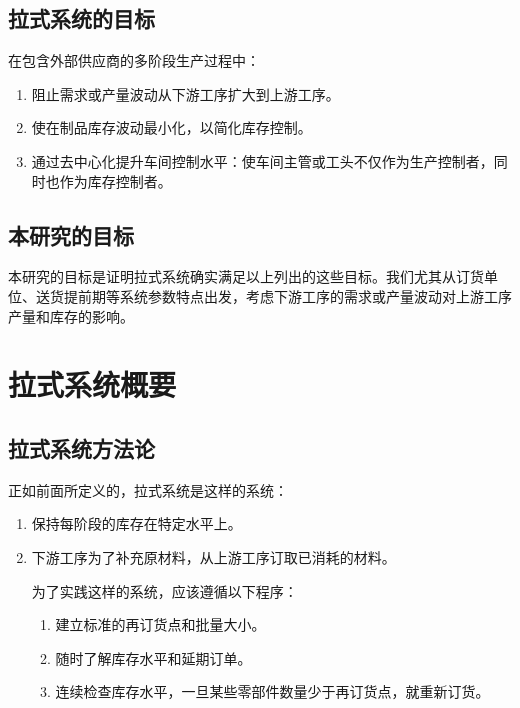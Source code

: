 \subsection{拉式系统的目标}

在包含外部供应商的多阶段生产过程中：

\begin{enumerate}
\item
阻止需求或产量波动从下游工序扩大到上游工序。
\item
使在制品库存波动最小化，以简化库存控制。
\item
通过去中心化提升车间控制水平：使车间主管或工头不仅作为生产控制者，同时也作为库存控制者。
\end{enumerate}

\subsection{本研究的目标}

本研究的目标是证明拉式系统确实满足以上列出的这些目标。我们尤其从订货单位、送货提前期等系统参数特点出发，考虑下游工序的需求或产量波动对上游工序产量和库存的影响。



\section{拉式系统概要}

\subsection{拉式系统方法论}

正如前面所定义的，拉式系统是这样的系统：

\begin{enumerate}
\item
保持每阶段的库存在特定水平上。
\item
下游工序为了补充原材料，从上游工序订取已消耗的材料。

为了实践这样的系统，应该遵循以下程序：

\begin{enumerate}
\item
建立标准的再订货点和批量大小。
\item
随时了解库存水平和延期订单。
\item
连续检查库存水平，一旦某些零部件数量少于再订货点，就重新订货。
\end{enumerate}
\end{enumerate}

